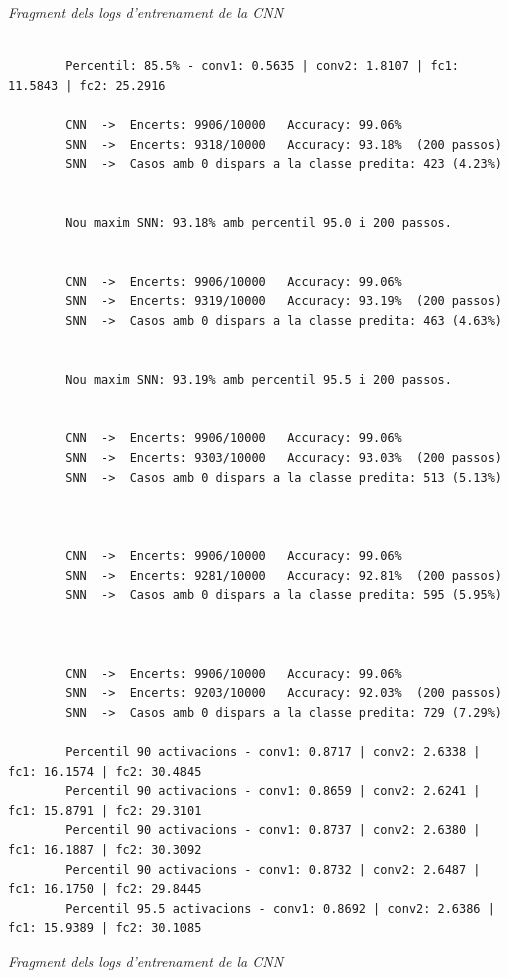 \documentclass[a4paper,11pt, titlepage, twoside]{article}
\begin{document}
\begin{appendices}
\begin{lstlisting}[style=logs, captionpos=b, label={lst:logs_ann}]
	\end{lstlisting}
	\vspace{-0.4cm}
	\begin{center}
		\small\textit{Fragment dels logs d'entrenament de la CNN}
	\end{center}

	\vspace{3mm}
	\begin{lstlisting}[style=logs, captionpos=b, label={lst:logs_ann}]

		Percentil: 85.5% - conv1: 0.5635 | conv2: 1.8107 | fc1: 11.5843 | fc2: 25.2916
		
		CNN  ->  Encerts: 9906/10000   Accuracy: 99.06%
		SNN  ->  Encerts: 9318/10000   Accuracy: 93.18%  (200 passos)
		SNN  ->  Casos amb 0 dispars a la classe predita: 423 (4.23%)
		

		Nou maxim SNN: 93.18% amb percentil 95.0 i 200 passos.

		
		CNN  ->  Encerts: 9906/10000   Accuracy: 99.06%
		SNN  ->  Encerts: 9319/10000   Accuracy: 93.19%  (200 passos)
		SNN  ->  Casos amb 0 dispars a la classe predita: 463 (4.63%)
		

		Nou maxim SNN: 93.19% amb percentil 95.5 i 200 passos.

		
		CNN  ->  Encerts: 9906/10000   Accuracy: 99.06%
		SNN  ->  Encerts: 9303/10000   Accuracy: 93.03%  (200 passos)
		SNN  ->  Casos amb 0 dispars a la classe predita: 513 (5.13%)
		

		
		CNN  ->  Encerts: 9906/10000   Accuracy: 99.06%
		SNN  ->  Encerts: 9281/10000   Accuracy: 92.81%  (200 passos)
		SNN  ->  Casos amb 0 dispars a la classe predita: 595 (5.95%)
		

		
		CNN  ->  Encerts: 9906/10000   Accuracy: 99.06%
		SNN  ->  Encerts: 9203/10000   Accuracy: 92.03%  (200 passos)
		SNN  ->  Casos amb 0 dispars a la classe predita: 729 (7.29%)
		
		Percentil 90 activacions - conv1: 0.8717 | conv2: 2.6338 | fc1: 16.1574 | fc2: 30.4845
		Percentil 90 activacions - conv1: 0.8659 | conv2: 2.6241 | fc1: 15.8791 | fc2: 29.3101
		Percentil 90 activacions - conv1: 0.8737 | conv2: 2.6380 | fc1: 16.1887 | fc2: 30.3092
		Percentil 90 activacions - conv1: 0.8732 | conv2: 2.6487 | fc1: 16.1750 | fc2: 29.8445
		Percentil 95.5 activacions - conv1: 0.8692 | conv2: 2.6386 | fc1: 15.9389 | fc2: 30.1085
	\end{lstlisting}
	\vspace{-0.4cm}
	\begin{center}
		\small\textit{Fragment dels logs d'entrenament de la CNN}
	\end{center}

\end{appendices}
\newpage
\end{document}
